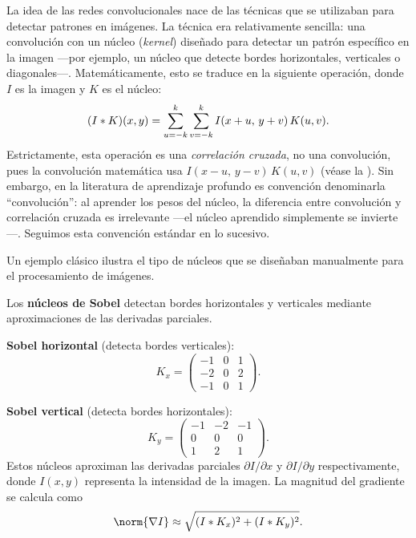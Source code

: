 La idea de las redes convolucionales nace de las t\'ecnicas que se utilizaban
para detectar patrones en im\'agenes. La t\'ecnica era relativamente sencilla:
una convoluci\'on con un n\'ucleo (\emph{kernel}) dise\~nado para detectar un
patr\'on espec\'ifico en la imagen ---por ejemplo, un n\'ucleo que detecte
bordes horizontales, verticales o diagonales---. Matem\'aticamente, esto se
traduce en la siguiente operaci\'on, donde $I$ es la imagen y $K$ es el n\'ucleo:
\begin{equation}
  (I * K)(x,y) = \sum_{u=-k}^{k}\sum_{v=-k}^{k} I(x+u,\, y+v)\, K(u,v).
  \label{eq:grids:convolution2d}
\end{equation}
Estrictamente, esta operaci\'on es una \emph{correlaci\'on cruzada}, no una
convoluci\'on, pues la convoluci\'on matem\'atica usa $I(x-u,\,y-v)\,K(u,v)$
(v\'ease la ). Sin embargo, en la literatura de
aprendizaje profundo es convenci\'on denominarla ``convoluci\'on'': al aprender
los pesos del n\'ucleo, la diferencia entre convoluci\'on y correlaci\'on
cruzada es irrelevante ---el n\'ucleo aprendido simplemente se invierte---.
Seguimos esta convenci\'on est\'andar en lo sucesivo.

Un ejemplo cl\'asico ilustra el tipo de n\'ucleos que se dise\~naban manualmente
para el procesamiento de im\'agenes.

\begin{example}
\label{ex:grids:sobel}
Los \textbf{n\'ucleos de Sobel} detectan bordes horizontales y verticales
mediante aproximaciones de las derivadas parciales.

\textbf{Sobel horizontal} (detecta bordes verticales):
\[
K_x = \begin{pmatrix} -1 & 0 & 1 \\ -2 & 0 & 2 \\ -1 & 0 & 1 \end{pmatrix}.
\]

\textbf{Sobel vertical} (detecta bordes horizontales):
\[
K_y = \begin{pmatrix} -1 & -2 & -1 \\ 0 & 0 & 0 \\ 1 & 2 & 1 \end{pmatrix}.
\]
Estos n\'ucleos aproximan las derivadas parciales $\partial I/\partial x$ y
$\partial I/\partial y$ respectivamente, donde $I(x,y)$ representa la intensidad
de la imagen. La magnitud del gradiente se calcula como
\[
  \norm{\nabla I} \approx \sqrt{(I \conv K_x)^2 + (I \conv K_y)^2}.
\]
\end{example}

